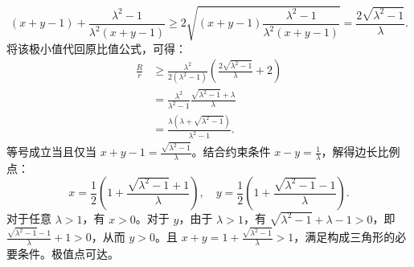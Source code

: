 \begin{solution}
\[
(x+y-1) + \frac{\lambda^2-1}{\lambda^2(x+y-1)} \ge 2\sqrt{(x+y-1) \frac{\lambda^2-1}{\lambda^2(x+y-1)}} = \frac{2\sqrt{\lambda^2-1}}{\lambda}.
\]
将该极小值代回原比值公式，可得：
\begin{align*}
\frac{R}{r} &\ge \frac{\lambda^2}{2(\lambda^2-1)} \left( \frac{2\sqrt{\lambda^2-1}}{\lambda} + 2 \right) \\
&= \frac{\lambda^2}{\lambda^2-1} \frac{\sqrt{\lambda^2-1}+\lambda}{\lambda} \\
&= \frac{\lambda(\lambda+\sqrt{\lambda^2-1})}{\lambda^2-1}.
\end{align*}
等号成立当且仅当 $x+y-1 = \frac{\sqrt{\lambda^2-1}}{\lambda}$。结合约束条件 $x-y = \frac{1}{\lambda}$，解得边长比例点：
\[
x = \frac{1}{2}\left(1 + \frac{\sqrt{\lambda^2-1}+1}{\lambda}\right), \quad y = \frac{1}{2}\left(1 + \frac{\sqrt{\lambda^2-1}-1}{\lambda}\right).
\]
对于任意 $\lambda > 1$，有 $x > 0$。对于 $y$，由于 $\lambda > 1$，有 $\sqrt{\lambda^2-1} + \lambda - 1 > 0$，即 $\frac{\sqrt{\lambda^2-1}-1}{\lambda} + 1 > 0$，从而 $y > 0$。且 $x+y = 1 + \frac{\sqrt{\lambda^2-1}}{\lambda} > 1$，满足构成三角形的必要条件。极值点可达。
\end{solution}





